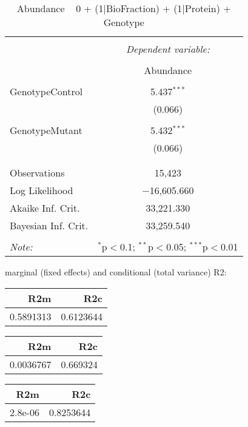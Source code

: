 \documentclass[11pt]{report}
\begin{document}
\begin{table}[!htbp] \centering 
  \caption{Abundance ~ 0 + (1|BioFraction) + (1|Protein) + Genotype} 
  \label{} 
\begin{tabular}{@{\extracolsep{5pt}}lc} 
\\[-1.8ex]\hline 
\hline \\[-1.8ex] 
 & \multicolumn{1}{c}{\textit{Dependent variable:}} \\ 
\cline{2-2} 
\\[-1.8ex] & Abundance \\ 
\hline \\[-1.8ex] 
 GenotypeControl & 5.437$^{***}$ \\ 
  & (0.066) \\ 
  & \\ 
 GenotypeMutant & 5.432$^{***}$ \\ 
  & (0.066) \\ 
  & \\ 
\hline \\[-1.8ex] 
Observations & 15,423 \\ 
Log Likelihood & $-$16,605.660 \\ 
Akaike Inf. Crit. & 33,221.330 \\ 
Bayesian Inf. Crit. & 33,259.540 \\ 
\hline 
\hline \\[-1.8ex] 
\textit{Note:}  & \multicolumn{1}{r}{$^{*}$p$<$0.1; $^{**}$p$<$0.05; $^{***}$p$<$0.01} \\ 
\end{tabular} 
\end{table} 
marginal (fixed effects) and conditional (total variance) R2:

\begin{tabular}{r|r}
\hline
R2m & R2c\\
\hline
0.5891313 & 0.6123644\\
\hline
\end{tabular}

\begin{tabular}{r|r}
\hline
R2m & R2c\\
\hline
0.0036767 & 0.669324\\
\hline
\end{tabular}

\begin{tabular}{r|r}
\hline
R2m & R2c\\
\hline
2.8e-06 & 0.8253644\\
\hline
\end{tabular}
\end{document}
